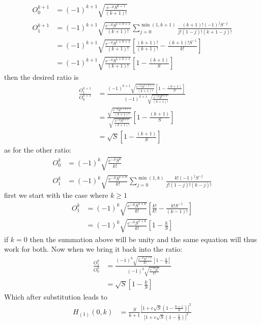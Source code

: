 \begin{align}
	O_{0}^{k+1} &= \left(-1\right)^{k+1} \sqrt{\frac{e^{-S}S^{k + 1}}{(k+1)!}} \\
	O_{1}^{k+1} &= \left(-1\right)^{k+1} \sqrt{\frac{e^{-S}S^{1+k+1}}{(k+1)!}} \sum_{j=0}^{\min \left( 1,k+1 \right)} \frac{(k+1)!(-1)^j S^{-j}}{j!(1-j)!(k+1-j)!}\\
	&= \left(-1\right)^{k+1} \sqrt{\frac{e^{-S}S^{1+k+1}}{(k+1)!}} \left[  \frac{(k+1)! }{(k+1)!}  - \frac{(k+1)! S^{-1}}{k!}\right]\\
	&= \left(-1\right)^{k+1} \sqrt{\frac{e^{-S}S^{1+k+1}}{(k+1)!}} \left[  1  - \frac{(k+1) }{S}\right]
\end{align}
then the desired ratio is
\begin{align}
	\frac{O_{1}^{k+1}}{ O_{0}^{k+1}} &=  \frac{\left(-1\right)^{k+1} \sqrt{\frac{e^{-S}S^{1+k+1}}{(k+1)!}} \left[  1  - \frac{(k+1) }{S}\right]}{\left(-1\right)^{k+1} \sqrt{\frac{e^{-S}S^{k + 1}}{(k+1)!}}}\\
	&=  \frac{ \sqrt{\frac{e^{-S}S^{1+k+1}}{(k+1)!}} }{ \sqrt{\frac{e^{-S}S^{k + 1}}{(k+1)!}}} \left[  1  - \frac{(k+1) }{S}\right]\\
	&= \sqrt{S} \left[  1  - \frac{(k+1) }{S}\right]
\end{align}
as for the other ratio:
\begin{align}
	O_{0}^{k} &= \left(-1\right)^{k} \sqrt{\frac{e^{-S}S^{k }}{k!}} \\
	O_{1}^{k} &= \left(-1\right)^{k} \sqrt{\frac{e^{-S}S^{1+k}}{k!}} \sum_{j=0}^{\min \left( 1,k \right)} \frac{k!(-1)^j S^{-j}}{j!(1-j)!(k-j)!}
\end{align}
first we start with the case where $k\geq1$
\begin{align}
	O_{1}^{k} &= \left(-1\right)^{k} \sqrt{\frac{e^{-S}S^{1+k}}{k!}} \left[ \frac{k! }{k!} - \frac{k! S^{-1}}{(k-1)!} \right] \\
	&= \left(-1\right)^{k} \sqrt{\frac{e^{-S}S^{1+k}}{k!}} \left[ 1 - \frac{k}{S} \right]
\end{align}
if $k=0$ then the summation above will be unity and the same equation will thus work for both.  Now when we bring it back into the ratio:
\begin{align}
	\frac{O_{1}^{k}}{O_{0}^{k}} &= \frac{\left(-1\right)^{k} \sqrt{\frac{e^{-S}S^{1+k}}{k!}} \left[ 1 - \frac{k}{S} \right]}{\left(-1\right)^{k} \sqrt{\frac{e^{-S}S^{k }}{k!}}}\\
	&= \sqrt{S} \left[  1  - \frac{k }{S}\right]
\end{align}
Which after substitution leads to
\begin{align}
	H_{(1)}(0,k)&= \frac{S }{k+1 } \frac{\left| 1 + c\sqrt{S} \left( 1  - \frac{k+1}{S} \right) \right|^2}{\left| 1 + c \sqrt{S} \left( 1  - \frac{k}{S} \right)\right|^2 }
\end{align}


